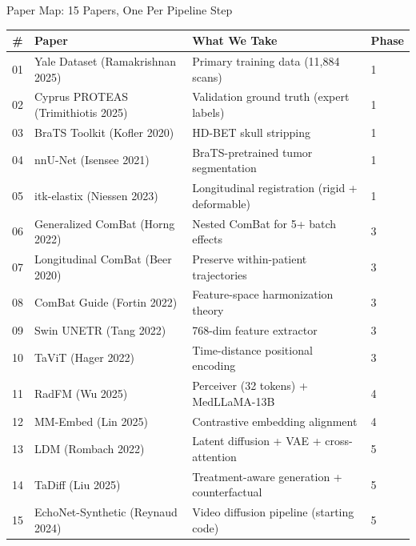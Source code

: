 \documentclass[aspectratio=169,xcolor=dvipsnames]{beamer}
\begin{document}
\begin{frame}{Paper Map: 15 Papers, One Per Pipeline Step}
    \begin{table}
        \centering
        \footnotesize
        \begin{tabular}{clll}
            \toprule
            \textbf{\#} & \textbf{Paper} & \textbf{What We Take} & \textbf{Phase} \\
            \midrule
            01 & Yale Dataset (Ramakrishnan 2025) & Primary training data (11,884 scans) & 1 \\
            02 & Cyprus PROTEAS (Trimithiotis 2025) & Validation ground truth (expert labels) & 1 \\
            03 & BraTS Toolkit (Kofler 2020) & HD-BET skull stripping & 1 \\
            04 & nnU-Net (Isensee 2021) & BraTS-pretrained tumor segmentation & 1 \\
            05 & itk-elastix (Niessen 2023) & Longitudinal registration (rigid + deformable) & 1 \\
            06 & Generalized ComBat (Horng 2022) & Nested ComBat for 5+ batch effects & 3 \\
            07 & Longitudinal ComBat (Beer 2020) & Preserve within-patient trajectories & 3 \\
            08 & ComBat Guide (Fortin 2022) & Feature-space harmonization theory & 3 \\
            09 & Swin UNETR (Tang 2022) & 768-dim feature extractor & 3 \\
            10 & TaViT (Hager 2022) & Time-distance positional encoding & 3 \\
            11 & RadFM (Wu 2025) & Perceiver (32 tokens) + MedLLaMA-13B & 4 \\
            12 & MM-Embed (Lin 2025) & Contrastive embedding alignment & 4 \\
            13 & LDM (Rombach 2022) & Latent diffusion + VAE + cross-attention & 5 \\
            14 & TaDiff (Liu 2025) & Treatment-aware generation + counterfactual & 5 \\
            15 & EchoNet-Synthetic (Reynaud 2024) & Video diffusion pipeline (starting code) & 5 \\
            \bottomrule
        \end{tabular}
    \end{table}
\end{frame}
\end{document}
